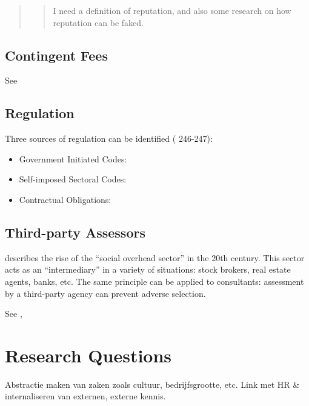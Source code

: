 \documentclass[12pt]{article}
\providecommand{\tightlist}{%
  \setlength{\itemsep}{0pt}\setlength{\parskip}{0pt}}
\begin{document}
\begin{quote}
\begin{quote}
I need a definition of reputation, and also some research on how
reputation can be faked.
\end{quote}
\end{quote}

\hypertarget{contingent-fees}{%
\subsection{Contingent Fees}\label{contingent-fees}}

See \citep[ 243]{clark1993}

\hypertarget{regulation}{%
\subsection{Regulation}\label{regulation}}

Three sources of regulation can be identified (\citet{clark1993}
246-247):

\begin{itemize}
\tightlist
\item
  Government Initiated Codes:
\item
  Self-imposed Sectoral Codes:
\item
  Contractual Obligations:
\end{itemize}

\hypertarget{third-party-assessors}{%
\subsection{Third-party Assessors}\label{third-party-assessors}}

\citet[57-62]{zucker1985} describes the rise of the ``social overhead
sector'' in the 20th century. This sector acts as an ``intermediary'' in
a variety of situations: stock brokers, real estate agents, banks, etc.
The same principle can be applied to consultants: assessment by a
third-party agency can prevent adverse selection.

See \citep[ 76-77]{armbruster2006},

\hypertarget{research-questions}{%
\section{Research Questions}\label{research-questions}}

Abstractie maken van zaken zoals cultuur, bedrijfsgrootte, etc. Link met
HR \& internaliseren van externen, externe kennis.
\end{document}
